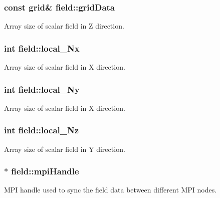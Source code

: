 \subsubsection[{\texorpdfstring{grid\+Data}{gridData}}]{\setlength{\rightskip}{0pt plus 5cm}const {\bf grid}\& field\+::grid\+Data}\hypertarget{classfield_a99eb1330d0129bf1e85ca4b26feff704}{}\label{classfield_a99eb1330d0129bf1e85ca4b26feff704}
Array size of scalar field in Z direction. 
\subsubsection[{\texorpdfstring{local\+\_\+\+Nx}{local_Nx}}]{\setlength{\rightskip}{0pt plus 5cm}int field\+::local\+\_\+\+Nx}\hypertarget{classfield_a5a48dd8a119d060d07c5b4c64ce36211}{}\label{classfield_a5a48dd8a119d060d07c5b4c64ce36211}
Array size of scalar field in X direction. 
\subsubsection[{\texorpdfstring{local\+\_\+\+Ny}{local_Ny}}]{\setlength{\rightskip}{0pt plus 5cm}int field\+::local\+\_\+\+Ny}\hypertarget{classfield_a19e5e4f47cd9471b1edf7cf3b059a736}{}\label{classfield_a19e5e4f47cd9471b1edf7cf3b059a736}
Array size of scalar field in X direction. 
\subsubsection[{\texorpdfstring{local\+\_\+\+Nz}{local_Nz}}]{\setlength{\rightskip}{0pt plus 5cm}int field\+::local\+\_\+\+Nz}\hypertarget{classfield_ac0e32c0b780aa74c30bacbc90c0fbeaf}{}\label{classfield_ac0e32c0b780aa74c30bacbc90c0fbeaf}
Array size of scalar field in Y direction. 
\subsubsection[{\texorpdfstring{mpi\+Handle}{mpiHandle}}]{$\ast$ field\+::mpi\+Handle}\hypertarget{classfield_adb31d61800661fceb68b660bd50641fb}{}\label{classfield_adb31d61800661fceb68b660bd50641fb}
M\+PI handle used to sync the field data between different M\+PI nodes. 
